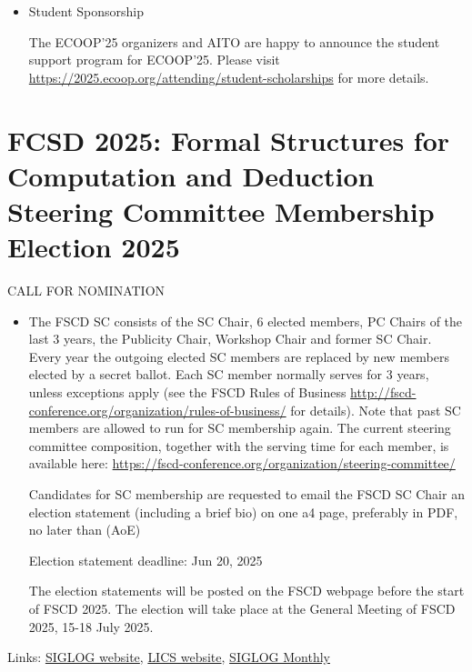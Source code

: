 \documentclass[prodmode,acmtecs]{acmsmall} %
\begin{document}
\begin{itemize}
\item  Student Sponsorship 
 
  The ECOOP'25 organizers and AITO are happy to announce the student support program for ECOOP'25.  Please visit \href{https://2025.ecoop.org/attending/student-scholarships}{https://2025.ecoop.org/attending/student-scholarships} for more details. 
 
\end{itemize}\section{FCSD 2025: Formal Structures for Computation and Deduction Steering Committee Membership Election 2025}\label{FCSD2025}CALL FOR NOMINATION 

\begin{itemize}\item  The FSCD SC consists of the SC Chair, 6 elected members, PC Chairs of the last 3 years, the Publicity Chair, Workshop Chair and former SC Chair. Every year the outgoing elected SC members are replaced by new members elected by a secret ballot. Each SC member normally serves for 3 years, unless exceptions apply (see the FSCD Rules of Business  \href{http://fscd-conference.org/organization/rules-of-business/}{http://fscd-conference.org/organization/rules-of-business/} for details). Note that past SC members are allowed to run for SC membership again. The current steering committee composition, together with the serving time for each member, is available here: \href{https://fscd-conference.org/organization/steering-committee/}{https://fscd-conference.org/organization/steering-committee/} 
 
  Candidates for SC membership are requested to email the FSCD SC Chair an election statement (including a brief bio) on one a4 page, preferably in PDF, no later than (AoE) 
 
Election statement deadline: Jun 20, 2025 
 
  The election statements will be posted on the FSCD webpage before the start of FSCD 2025. The election will take place at the General Meeting of FSCD 2025, 15-18 July 2025.  
 
\end{itemize}


\bigskip Links: \href{http://siglog.org/}{SIGLOG website}, \href{https://lics.siglog.org}{LICS website}, \href{https://lics.siglog.org/newsletters/}{SIGLOG Monthly}
\end{document}
